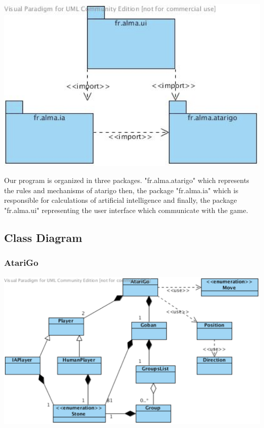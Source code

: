 \documentclass[11pt,a4paper]{report}
\begin{document}
\begin{center}
	\includegraphics[scale=0.70]{images/package_diag}
\end{center}

    Our program is organized in three packages. "fr.alma.atarigo" which represents the rules and mechanisms of atarigo then, the package "fr.alma.ia" which is responsible for calculations of artificial intelligence and finally, the package "fr.alma.ui" representing the user interface which communicate with the game.

\subsection*{Class Diagram}


\subsubsection*{AtariGo}


\begin{center}
	\includegraphics[scale=0.70]{images/class_diag}
\end{center}
\end{document}
